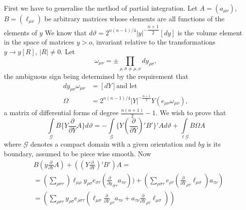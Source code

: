 First we have to generalise the method of partial integration. Let $A
= (a_{\mu \nu})$, $B = (\ell _{\mu \nu})$ be arbitrary matrices whose
elements are all functions of the elements of $y$ We know that $d
\vartheta = 2^{n (n-1)/4} |y|^{-\dfrac{n+1}{2}} [dy]$ is the volume
element in the space of matrices $y > o$, invariant relative to the
transformations $y \to y [R]$, $| R | \neq 0$. Let 
$$
\omega_{\mu \nu} = \pm \prod_{\rho, \sigma \neq \mu, \nu} dy_{\rho \sigma},
$$ 
the ambiguous sign being determined by the requirement that 
\begin{align*}
dy_{\mu \nu} \omega_{\mu \nu} & = [dY] \text{and let}\\
\Omega & =2 ^{n (n-1)/4} |Y| ^{-\frac{n+1}{2}} Y (e_{\mu \nu}
\omega_{\mu \nu}),  
\end{align*}\pageoriginale
a matrix of differential forms of degree $\frac{n (n+1)}{2}-1$. We 
wish to prove that  
\begin{equation*}
\int\limits_\mathcal{G} B \{Y \frac{\partial} {\partial Y} A \} d \vartheta =
-\int\limits_\mathcal{G} \{ Y (\frac{\partial}{ \partial Y})' B'\}' A d
\vartheta + \int\limits_{\ell \mathcal{G}} B \Omega A \tag{401}\label{eq401} 
\end{equation*}
where $\mathcal{G}$ denotes a compact domain with a given orientation
and $bg$ is its boundary, assumed to be piece wise
smooth. Now  
\begin{align*}
& B (y \frac{\partial} {\partial Y} A) + ( ( Y \frac{\partial}
  {\partial Y})'B')A =\\ 
& = (\sum_{\rho \sigma \tau}) \ell_{\mu \rho} y_{\rho \sigma}
  e_{\sigma \tau} (\frac{\partial}{\partial y}_{\sigma \tau} a_{\tau
    \nu})) + (\sum_{\rho \sigma \tau} e_{\rho \tau } (\frac{\partial}
  {\partial Y}_{\rho \tau } \ell _{\mu \sigma }) a_{\tau \nu})\\ 
& = (\sum_{\rho \sigma \tau} y _{\rho \sigma} e _{\rho \sigma \tau}
  (\ell _{\mu \sigma} \frac{\partial} {\partial Y}_{\rho\tau} a_{\tau
    \nu } + a_{\tau \nu} \frac{\partial} {\partial Y}_{\rho \tau} \ell
  _{\mu \sigma})) \tag{402}\label{eq402} 
\end{align*}

